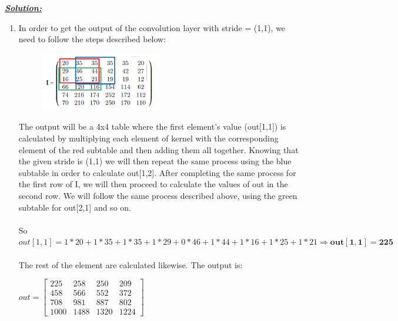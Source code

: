 \documentclass{article}
\begin{document}
\noindent \underline{\textbf{\textit{Solution:}}} \\ 

\begin{enumerate} [label=\Alph*]
    \item In order to get the output of the convolution layer with stride = (1,1), we need to follow the steps described below: \\
          \begin{figure}[h]
            \centering
            \includegraphics[width=0.5\textwidth]{prob11_a.png} \\      
          \end{figure}
          \newpage
          \noindent The output will be a 4x4 table where the first element's value (out[1,1]) is calculated by multiplying each element of kernel with the corresponding 
          element of the red subtable and then adding them all together. Knowing that the given stride is (1,1) we will then repeat the same process using the blue subtable in 
          order to calculate out[1,2]. After completing the same process for the first row of I, we will then proceed to calculate the values of out in the second row. We will follow 
          the same process described above, using the green subtable for out[2,1] and so on. \\ \\ 
          So $out[1,1] = 1*20 + 1*35 + 1*35 + 1*29 + 0*46 + 1*44 + 1*16 + 1*25 + 1*21 \Rightarrow \bm{out[1,1] = 225}$\\ \\
          The rest of the element are calculated likewise. The output is:
        \begin{center}
        $ out = \begin{bmatrix}
            225 & 258 & 250 & 209 \\
            458 & 566 & 552 & 372 \\
            708 & 981 & 887 & 802 \\
            1000 & 1488 & 1320 & 1224 
        \end{bmatrix}$ \\
        \end{center}
        

\end{enumerate}
\end{document}

